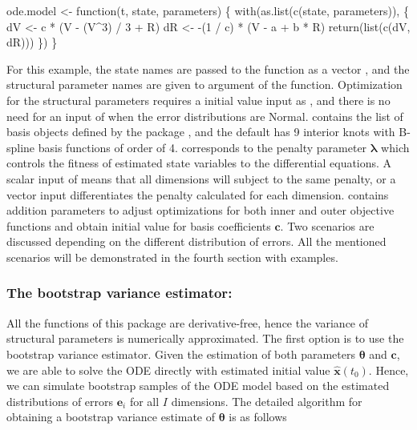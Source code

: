 \begin{example*}
ode.model <- function(t, state, parameters) \{
  with(as.list(c(state, parameters)), \{
    dV <- c * (V - (V^3) / 3 + R)
    dR <- -(1 / c) * (V - a + b * R)
    return(list(c(dV, dR)))
  \})
\}
\end{example*}


For this example, the state names are passed to the function  as a vector , and the structural parameter names  are given to  argument of the function. Optimization for the structural parameters requires a initial value input as , and there is no need for an input of  when the error distributions are Normal.  contains the list of basis objects defined by the package , and the default  has 9 interior knots with B-spline basis functions of order of 4.  corresponds to the penalty parameter $\bm{\lambda}$ which controls the fitness of estimated state variables to the differential equations. A scalar input of  means that all dimensions will subject to the same penalty, or a vector input differentiates the penalty calculated for each dimension.  contains addition parameters to adjust optimizations for both inner and outer objective functions and obtain initial value for basis coefficients $\bm{c}$. Two scenarios are discussed depending on the different distribution of errors. All the mentioned scenarios will be demonstrated in the fourth section with examples.

\subsubsection[bootsvar]{The bootstrap variance estimator: }
All the functions of this package are derivative-free, hence the variance of structural parameters is numerically approximated. The first option is to use the bootstrap variance estimator. Given the estimation of both parameters $\bm{\theta}$ and $\bm{c}$, we are able to solve the ODE directly with estimated initial value $\hat{\bm{x}}(t_{0})$. Hence, we can simulate bootstrap samples of the ODE model based on the estimated distributions of errors $\bm{e}_{i}$ for all $I$ dimensions. The detailed algorithm for obtaining a bootstrap variance estimate of $\bm{\theta}$ is as follows

